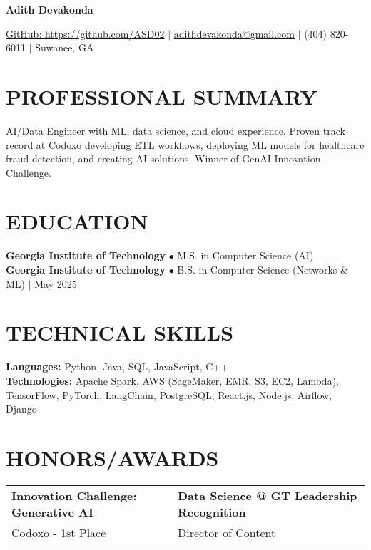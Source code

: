 \documentclass[10pt,a4paper]{article}
\begin{document}
\begin{center}
    {\Large \bfseries Adith Devakonda}
    \vspace{2pt}
    
    \href{https://github.com/ASD02}{GitHub: https://github.com/ASD02} $|$
    \href{mailto:adithdevakonda@gmail.com}{adithdevakonda@gmail.com} $|$
    (404) 820-6011 $|$
    Suwanee, GA
\end{center}

\section*{PROFESSIONAL SUMMARY}
AI/Data Engineer with ML, data science, and cloud experience. Proven track record at Codoxo developing ETL workflows, deploying ML models for healthcare fraud detection, and creating AI solutions. Winner of GenAI Innovation Challenge.

\section*{EDUCATION}
\textbf{Georgia Institute of Technology} $\bullet$ M.S. in Computer Science (AI) \\
\textbf{Georgia Institute of Technology} $\bullet$ B.S. in Computer Science (Networks \& ML) $|$ May 2025

\section*{TECHNICAL SKILLS}
\textbf{Languages:} Python, Java, SQL, JavaScript, C++ \\
\textbf{Technologies:} Apache Spark, AWS (SageMaker, EMR, S3, EC2, Lambda), TensorFlow, PyTorch, LangChain, PostgreSQL, React.js, Node.js, Airflow, Django

\section*{HONORS/AWARDS}
\begin{tabular}{@{}p{} p{}@{}}
\textbf{Innovation Challenge: Generative AI} & \textbf{Data Science @ GT Leadership Recognition} \\
Codoxo - 1st Place & Director of Content \\
\end{tabular}
\end{document}
